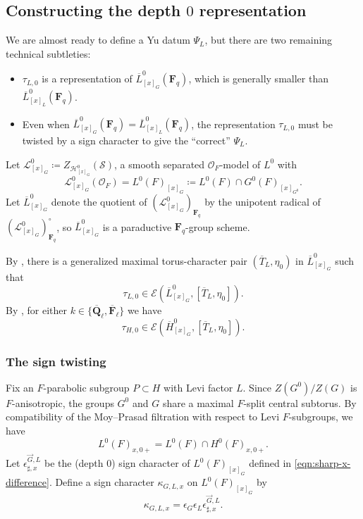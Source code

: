\documentclass[reqno]{amsart}
\numberwithin{equation}{subsection}
\newcommand{\F}{\mathbf{F}}
\newcommand{\Q}{\mathbf{Q}}
\newcommand{\ol}[1]{\overline{#1}}
\newcommand\cE{\mathcal{E}}
\newcommand\cH{\mathcal{H}}
\newcommand\cL{\mathcal{L}}
\newcommand\cO{\mathcal{O}}
\newcommand\cS{\mathcal{S}}
\theoremstyle{remark}
\numberwithin{equation}{subsection}
\numberwithin{figure}{subsection}
\begin{document}
\subsection{Constructing the depth $0$ representation}\label{sssec:descended-depth-zero-rep}

We are almost ready to define a Yu datum $\Psi_L$, but there are two remaining technical subtleties:
\begin{itemize}
\item $\tau_{L,0}$ is a representation of $\ol L^0_{[x]_G}(\F_q)$, which is generally smaller than $\ol L^0_{[x]_L}(\F_q)$.
\item Even when $\ol L^0_{[x]_G}(\F_q) = \ol L^0_{[x]_L}(\F_q)$, the representation $\tau_{L,0}$ must be twisted by a sign character to give the ``correct'' $\Psi_L$.
\end{itemize}

Let $\cL^0_{[x]_G}\coloneqq Z_{\cH^0_{[x]_G}}(\cS)$, a smooth separated $\cO_F$-model of $L^0$ with
\[
\cL^0_{[x]_G}(\cO_F)=L^0(F)_{[x]_G}\coloneqq L^0(F)\cap G^0(F)_{[x]_{G^0}}.
\]
Let $\ol L^0_{[x]_G}$ denote the quotient of $(\cL^0_{[x]_G})_{\F_q}$ by the unipotent radical of $(\cL^0_{[x]_G})_{\F_q}^\circ$, so $\ol L^0_{[x]_G}$ is a paraductive $\F_q$-group scheme.

By \cite[Proposition~2.6.2]{Cot26b}, there is a generalized maximal torus-character pair $(\ol T_L,\eta_0)$ in $\ol L^0_{[x]_G}$ such that
\[
\tau_{L,0}\in\cE(\ol L^0_{[x]_G},[\ol T_L,\eta_0]).
\]
By \cite[Proposition~2.8.5]{Cot26b}, for either $k\in\{\ol\Q_\ell,\ol\F_\ell\}$ we have
\[
\tau_{H,0}\in\cE(\ol H^0_{[x]_G},[\ol T_L,\eta_0]).
\]

\subsubsection{The sign twisting}
Fix an $F$-parabolic subgroup $P\subset H$ with Levi factor $L$. Since $Z(G^0)/Z(G)$ is $F$-anisotropic, the groups $G^0$ and $G$ share a maximal $F$-split central subtorus. By compatibility of the Moy--Prasad filtration with respect to Levi $F$-subgroups, we have
\[
L^0(F)_{x,0+}=L^0(F)\cap H^0(F)_{x,0+}.
\]
Let $\epsilon_{\sharp,x}^{\vec G, L}$ be the (depth $0$) sign character of $L^0(F)_{[x]_G}$ defined in \eqref{eqn:sharp-x-difference}.
Define a sign character $\kappa_{G,L,x}$ on $L^0(F)_{[x]_G}$ by
\begin{equation}\label{eq:ambient-full-sharp-character}
\kappa_{G,L,x}
=\epsilon_G\epsilon_L\epsilon_{\sharp,x}^{\vec G, L}.
\end{equation}
\end{document}
